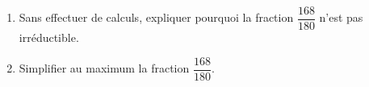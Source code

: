 \documentclass[exercice]{thedocument}%
\begin{document}
%
\begin{enumerate}
    \item Sans effectuer de calculs, expliquer pourquoi la fraction $\dfrac{168}{180}$ n'est pas
    irréductible.
    \answerspace{1.5cm}
    \item Simplifier au maximum la fraction $\dfrac{168}{180}$.
    \answerspace{1.5cm}
\end{enumerate}
\end{document}
